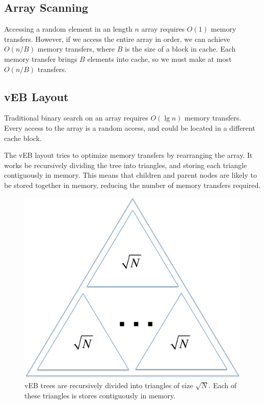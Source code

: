 \subsection*{Array Scanning}
Accessing a random element in an length $n$ array requires $O(1)$ memory
transfers. However, if we access the entire array in order, we can achieve
$O(n/B)$ memory transfers, where $B$ is the size of a block in cache. Each
memory transfer brings $B$ elements into cache, so we must make at most
$O(n/B)$ transfers.

\subsection*{vEB Layout} 
Traditional binary search on an array requires $O(\lg n)$ 
memory transfers. Every access to the array is a random access, and could
be located in a different cache block.

The vEB layout tries to optimize memory transfers by rearranging the array. It
works be recursively dividing the tree into triangles, and storing each
triangle contiguously in memory. This means that children and parent nodes are
likely to be stored together in memory, reducing the number of memory transfers
required.

\begin{figure}[h]
\begin{center}
\includegraphics[scale=.35]{veb.pdf}
\end{center}
\caption{vEB trees are recursively divided into triangles of size $\sqrt{N}$. Each of these
triangles is stores contiguously in memory.}
\label{fig:veb} 
\end{figure}

